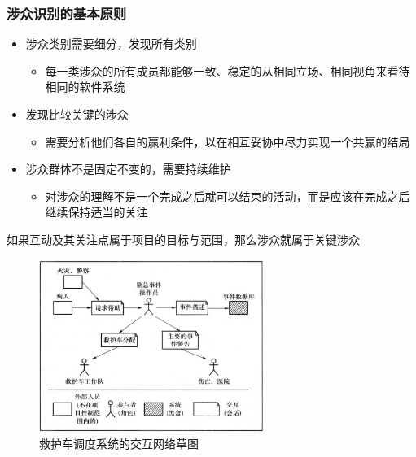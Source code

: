 \subsubsection{涉众识别的基本原则}
\begin{itemize}
    \item 涉众类别需要细分，发现所有类别
    \begin{itemize}
        \item 每一类涉众的所有成员都能够一致、稳定的从相同立场、相同视角来看待相同的软件系统
    \end{itemize}
    \item 发现比较关键的涉众
    \begin{itemize}
        \item 需要分析他们各自的赢利条件，以在相互妥协中尽力实现一个共赢的结局
    \end{itemize}
    \item 涉众群体不是固定不变的，需要持续维护
    \begin{itemize}
        \item 对涉众的理解不是一个完成之后就可以结束的活动，而是应该在完成之后继续保持适当的关注
    \end{itemize}
\end{itemize}

如果互动及其关注点属于项目的目标与范围，那么涉众就属于关键涉众
\begin{figure}[H]
	\centering
	\includegraphics[width=0.65\textwidth]{img/救护车调度系统的交互网络草图.png}
    \caption*{救护车调度系统的交互网络草图}
    \vspace{-1em}
\end{figure}

